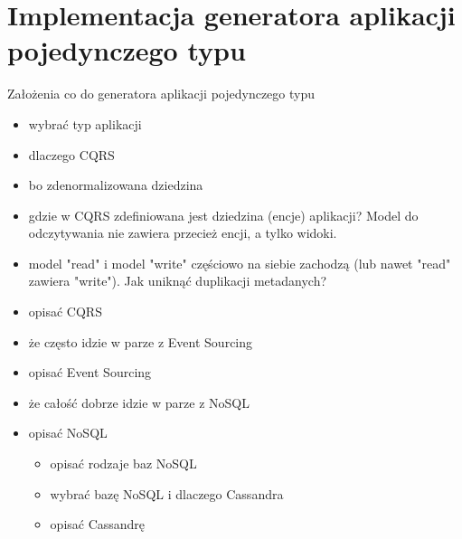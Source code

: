 \chapter{Implementacja generatora aplikacji pojedynczego typu} \label{chap:implementation:single_type}


Założenia co do generatora aplikacji pojedynczego typu
 \begin{itemize}
  \item wybrać typ aplikacji
  \item dlaczego CQRS
   \item bo zdenormalizowana dziedzina
   \item gdzie w CQRS zdefiniowana jest dziedzina (encje) aplikacji? Model do odczytywania nie zawiera przecież encji, a tylko widoki.
   \item model "read" i model "write" częściowo na siebie zachodzą (lub nawet "read" zawiera "write"). Jak uniknąć duplikacji metadanych?
  \item opisać CQRS
  \item że często idzie w parze z Event Sourcing
  \item opisać Event Sourcing
  \item że całość dobrze idzie w parze z NoSQL
  \item opisać NoSQL
   \begin{itemize}
    \item opisać rodzaje baz NoSQL
    \item wybrać bazę NoSQL i dlaczego Cassandra
    \item opisać Cassandrę
   \end{itemize}
 \end{itemize}

